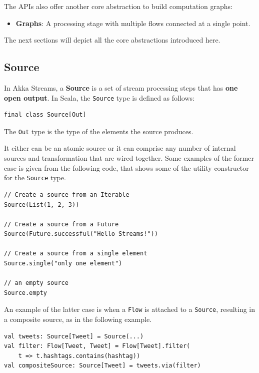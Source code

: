 The APIs also offer another core abstraction to build computation
graphs: 

\begin{itemize}
\itemsep1pt\parskip0pt
\item
  \textbf{Graphs}: A processing stage with multiple flows
connected at a single point.
\end{itemize}

The next sections will depict all the core abstractions introduced here.


\subsection{Source}\label{source}

In Akka Streams, a \textbf{Source} is a set of stream processing steps
that has \textbf{one open output}. In Scala, the \texttt{Source} type is
defined as follows:

\begin{verbatim}
final class Source[Out]
\end{verbatim}

The \texttt{Out} type is the type of the elements the source produces.

It either can be an atomic source or it can comprise any number of
internal sources and transformation that are wired together. Some
examples of the former case is given from the following code, that shows
some of the utility constructor for the \texttt{Source} type.

\begin{verbatim}
// Create a source from an Iterable
Source(List(1, 2, 3))

// Create a source from a Future
Source(Future.successful("Hello Streams!"))

// Create a source from a single element
Source.single("only one element")

// an empty source
Source.empty
\end{verbatim}

An example of the latter case is when a \texttt{Flow} is attached to a
\texttt{Source}, resulting in a composite source, as in the following
example.

\begin{verbatim}
val tweets: Source[Tweet] = Source(...)
val filter: Flow[Tweet, Tweet] = Flow[Tweet].filter(
	t => t.hashtags.contains(hashtag))
val compositeSource: Source[Tweet] = tweets.via(filter)
\end{verbatim}

